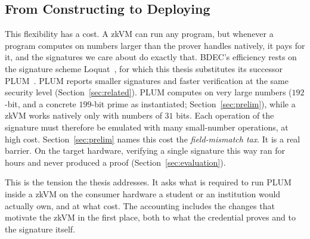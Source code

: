 \subsection{From Constructing to Deploying}\label{ssec:deploy-question}
This flexibility has a cost. A zkVM can run any program, but whenever a program computes on numbers larger than the prover handles natively, it pays for it, and the signatures we care about do exactly that. BDEC's efficiency rests on the signature scheme Loquat~\cite{cryptoeprint:2024/868}, for which this thesis substitutes its successor PLUM~\cite{10.1007/978-981-95-2961-2_6}. PLUM reports smaller signatures and faster verification at the same security level (Section~\ref{sec:related}). PLUM computes on very large numbers ($192$-bit, and a concrete $199$-bit prime as instantiated; Section~\ref{sec:prelim}), while a zkVM works natively only with numbers of $31$ bits. Each operation of the signature must therefore be emulated with many small-number operations, at high cost. Section~\ref{sec:prelim} names this cost the \emph{field-mismatch tax}. It is a real barrier. On the target hardware, verifying a single signature this way ran for hours and never produced a proof (Section~\ref{sec:evaluation}).

This is the tension the thesis addresses. It asks what is required to run PLUM inside a zkVM on the consumer hardware a student or an institution would actually own, and at what cost. The accounting includes the changes that motivate the zkVM in the first place, both to what the credential proves and to the signature itself.



